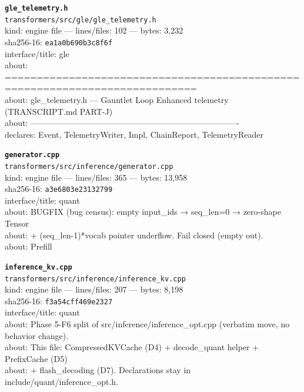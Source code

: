 \noindent\textbf{\texttt{gle\_telemetry.h}}\\
\texttt{transformers/src/gle/gle\_telemetry.h}\\
kind: engine file --- lines/files: 102 --- bytes: 3,232\\
sha256-16: \texttt{ea1a0b690b3c8f6f}\\
interface/title: gle\\
about: ============================================================================\\
about: gle\_telemetry.h — Gauntlet Loop Enhanced telemetry (TRANSCRIPT.md PART-J)\\
about: ----------------------------------------------------------------------------\\
declares: Event, TelemetryWriter, Impl, ChainReport, TelemetryReader\\
\vspace*{6.0pt}

\noindent\textbf{\texttt{generator.cpp}}\\
\texttt{transformers/src/inference/generator.cpp}\\
kind: engine file --- lines/files: 365 --- bytes: 13,958\\
sha256-16: \texttt{a3e6803e23132799}\\
interface/title: quant\\
about: BUGFIX (bug census): empty input\_ids → seq\_len=0 → zero-shape Tensor\\
about: + (seq\_len-1)*vocab pointer underflow. Fail closed (empty out).\\
about: Prefill\\
\vspace*{6.0pt}

\noindent\textbf{\texttt{inference\_kv.cpp}}\\
\texttt{transformers/src/inference/inference\_kv.cpp}\\
kind: engine file --- lines/files: 207 --- bytes: 8,198\\
sha256-16: \texttt{f3a54cff469e2327}\\
interface/title: quant\\
about: Phase 5-F6 split of src/inference/inference\_opt.cpp (verbatim move, no behavior change).\\
about: This file: CompressedKVCache (D4) + decode\_quant helper + PrefixCache (D5)\\
about: + flash\_decoding (D7). Declarations stay in include/quant/inference\_opt.h.\\
\vspace*{6.0pt}
\newpage


